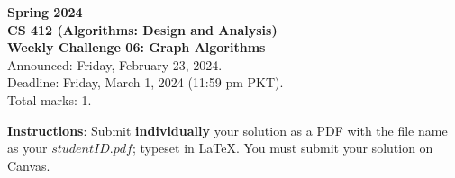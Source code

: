 \documentclass[a4paper]{exam}
\begin{document}
\begin{center}
{\Large \textbf{Spring 2024}}\vspace{1.0em}\\
{\Large \textbf{CS 412 (Algorithms: Design and Analysis)}}\vspace{1.0em}\\
{\Large \textbf{Weekly Challenge 06: Graph Algorithms}}\vspace{1.0em}\\
{\Large Announced: Friday, February 23, 2024.}\\
\vspace{.25em}
{\Large Deadline: Friday, March 1, 2024 (11:59 pm PKT).}\\ 
\vspace{.3em}
{\Large Total marks: 1.}
\vspace{.5em}\\
\end{center}
\textbf{Instructions}: Submit \textbf{individually} your solution as a PDF with the file name as your $studentID.pdf$; typeset in LaTeX. You must submit your solution on Canvas.
\end{document}
